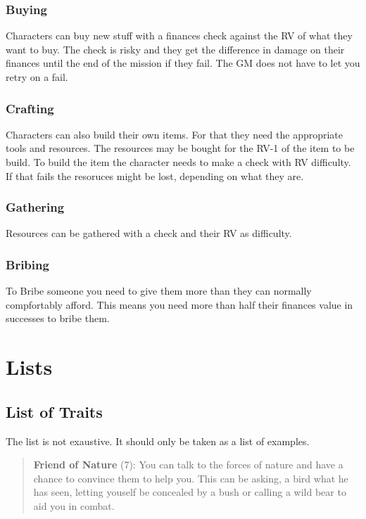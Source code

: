 \documentclass[11pt]{article}
\begin{document}
{\begin{multicols}{2}[]
\subsubsection{Buying}
\label{sec:orgb073b67}
Characters can buy new stuff with a finances check against the RV of what they want to buy. The check is risky and they get the difference in damage on their finances until the end of the mission if they fail. The GM does not have to let you retry on a fail.

\subsubsection{Crafting}
\label{sec:orge836916}
Characters can also build their own items. For that they need the appropriate tools and resources. The resources may be bought for the RV-1 of the item to be build. To build the item the character needs to make a check with RV difficulty. If that fails the resoruces might be lost, depending on what they are.

\subsubsection{Gathering}
\label{sec:orgf3c51d9}
Resources can be gathered with a check and their RV as difficulty.

\subsubsection{Bribing}
\label{sec:orgbc14048}
To Bribe someone you need to give them more than they can normally compfortably afford. This means you need more than half their finances value in successes to bribe them.

\newpage
\section{Lists}
\label{sec:org9826e1a}

\subsection{List of Traits}
\label{sec:orgdba58df}
The list is not exaustive. It should only be taken as a list of examples.

\begin{quote}
\textbf{Friend of Nature} (7): You can talk to the forces of nature and have a chance to convince them to help you. This can be asking, a bird what he has seen, letting youself be concealed by a bush or calling a wild bear to aid you in combat.
\end{quote}


\end{multicols}}
\end{document}
